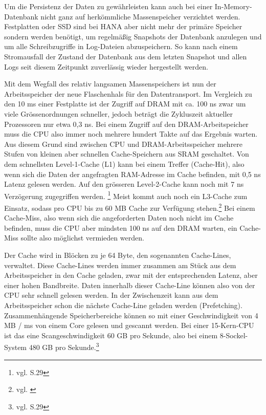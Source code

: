 Um die Persistenz der Daten zu gewährleisten kann auch bei einer In-Memory-Datenbank
nicht ganz auf herkömmliche Massenspeicher verzichtet werden. Festplatten oder SSD
sind bei HANA aber nicht mehr der primäre Speicher sondern werden benötigt, 
um regelmäßig Snapshots der Datenbank anzulegen und um alle 
Schreibzugriffe in Log-Dateien abzuspeichern. So kann nach einem Stromausfall der Zustand
der Datenbank aus dem letzten Snapshot und allen Logs seit diesem Zeitpunkt 
zuverlässig  wieder hergestellt werden.

Mit dem Wegfall des relativ langsamen Massenspeichers ist nun der Arbeitsspeicher
der neue Flaschenhals für den Datentransport. Im Vergleich zu den 10 ms einer Festplatte ist der Zugriff
auf DRAM mit ca. 100 ns zwar um viele Grössenordnungen schneller, jedoch beträgt die 
Zykluszeit aktueller Prozessoren nur etwa 0,3 ns. Bei einem Zugriff auf den DRAM-Arbeitspeicher
muss die CPU also immer noch mehrere hundert Takte auf das Ergebnis warten. Aus diesem Grund
sind zwischen CPU und DRAM-Arbeitsspeicher mehrere Stufen von kleinen aber schnellen
Cache-Speichern aus SRAM geschaltet. Von dem schnellsten Level-1-Cache (L1) kann bei einem
Treffer (Cache-Hit), also wenn sich die Daten der angefragten RAM-Adresse im Cache befinden, 
mit 0,5 ns Latenz gelesen werden. Auf den grösseren Level-2-Cache kann noch mit 7 ns
Verzögerung zugegriffen werden. \footnote{vgl. \cite{Plattner2015hpi} S.29} Meist kommt auch
noch ein L3-Cache  zum Einsatz, sodass pro CPU bis zu 60 MB Cache zur Verfügung stehen.\footnote{vgl. \cite{Intel2016}}
Bei einem Cache-Miss, also wenn sich die angeforderten Daten noch nicht im Cache befinden,
muss die CPU aber mindsten 100 ns auf den DRAM warten, ein Cache-Miss sollte also möglichst vermieden werden.

Der Cache wird in Blöcken zu je 64 Byte, den sogenannten Cache-Lines, verwaltet. 
Diese Cache-Lines werden immer zusammen am Stück aus dem Arbeitsspeicher in den Cache geladen,
zwar mit der entsprechenden Latenz, aber einer hohen Bandbreite.
Daten innerhalb dieser Cache-Line können also von der CPU sehr schnell gelesen werden.
In der Zwischenzeit kann aus dem Arbeitsspeicher schon die nächste Cache-Line geladen werden
(Prefetching). Zusammenhängende Speicherbereiche können so mit einer Geschwindigkeit 
von 4 MB / ms von einem Core gelesen und gescannt werden. Bei einer 15-Kern-CPU ist 
das eine Scangeschwindigkeit 60 GB pro Sekunde, also bei einem 8-Sockel-System 480 GB pro Sekunde.\footnote{vgl. \cite{Plattner2015hpi} S.29}

